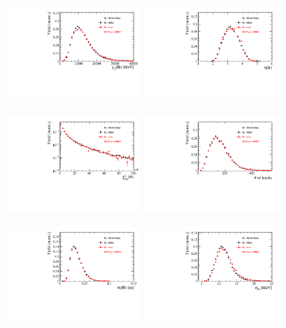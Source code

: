\begin{figure}[h]
\centering
\includegraphics[height=!,width=0.4\textwidth]{figs/dataVsMC/finalState_norm/Ds2all_Bs_PT.pdf}
\includegraphics[height=!,width=0.4\textwidth]{figs/dataVsMC/finalState_norm/Ds2all_Bs_ETA.pdf}

\includegraphics[height=!,width=0.4\textwidth]{figs/dataVsMC/finalState_norm/Ds2all_Bs_FDCHI2_OWNPV.pdf}
\includegraphics[height=!,width=0.4\textwidth]{figs/dataVsMC/finalState_norm/Ds2all_NTracks.pdf}

\includegraphics[height=!,width=0.4\textwidth]{figs/dataVsMC/finalState_norm/Ds2all_Bs_DTF_TAUERR.pdf}
\includegraphics[height=!,width=0.4\textwidth]{figs/dataVsMC/finalState_norm/Ds2all_Bs_DTF_MERR.pdf}


\end{figure}
